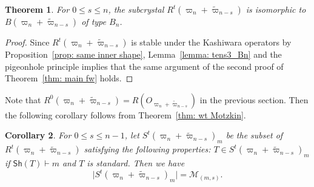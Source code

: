 \documentclass[11pt, leqno]{amsart}
\theoremstyle{plain}
\newtheorem{theorem}{Theorem}[section]
\newtheorem{corollary}[theorem]{Corollary}
\theoremstyle{definition}
\numberwithin{equation}{section}
\newcommand{\fw}{\varpi} %
\newcommand{\tfw}{\widetilde{\fw}} %
\newcommand{\Mot}{\mathcal{M}} %
\newcommand{\Sh}{\mathsf{Sh}}
\begin{document}
\begin{theorem} \label{thm: main mz}
For $0\le s \le n$, the subcrystal $R^t(\fw_n+\tfw_{n-s})$ is isomorphic to $B(\fw_n+\tfw_{n-s})$ of type $B_n$.
\end{theorem}

\begin{proof}
Since $R^t(\fw_n+\tfw_{n-s})$ is stable under the Kashiwara operators by Proposition~\ref{prop: same inner shape}, Lemma~\ref{lemma: tens3_Bn} and the pigeonhole principle implies that the same argument of the second proof of Theorem~\ref{thm: main fw} holds.
\end{proof}

Note that $R^0(\fw_n+\tfw_{n-s}) = R(O_{\fw_n+\tfw_{n-s}})$ in the previous section. Then the following corollary follows from
Theorem~\ref{thm: wt Motzkin}.

\begin{corollary} For $0\le s \le n-1$,
let $S^t(\fw_n+\tfw_{n-s})_m$ be the subset of $R^t(\fw_n+\tfw_{n-s})$ satisfying the following properties:
$T \in S^t(\fw_n+\tfw_{n-s})_m$ if $\Sh(T) \vdash m$ and $T$ is standard. Then we have
\[
\lvert S^t(\fw_n+\tfw_{n-s})_m \rvert = \Mot_{(m,s)}.
\]
\end{corollary}
\end{document}
